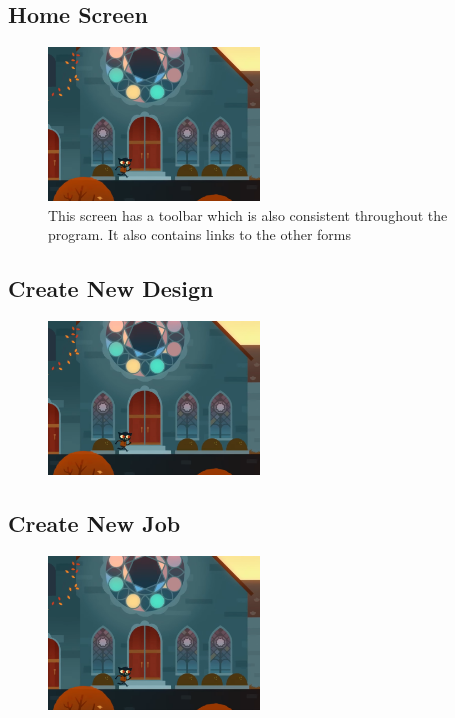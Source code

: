 \documentclass[oneside,openany,11pt,a4paper]{report}
\begin{document}
\subsection{Home Screen}
\begin{figure}[H]
	\centering
	\includegraphics[width=0.5\textwidth]{sd4.png}
	\caption{This screen has a toolbar which is also consistent throughout the program. It also contains links to the other forms }
\end{figure}

\subsection{Create New Design}
\begin{figure}[H]
	\centering
	\includegraphics[width=0.5\textwidth]{sd5.png}
	\caption{}
\end{figure}

\subsection{Create New Job}
\begin{figure}[H]
	\centering
	\includegraphics[width=0.5\textwidth]{sd6.png}
	\caption{}
\end{figure}
\end{document}
